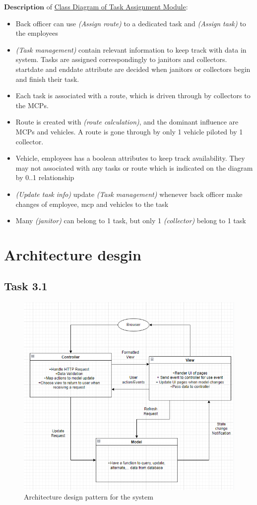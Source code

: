 \documentclass[a4paper]{article}
\begin{document}
$\textbf{Description}$ of \hyperlink{class}{Class Diagram of Task Assignment Module}:
\begin{itemize}
    \item Back officer can use \textit{(Assign route)} to a dedicated task and \textit{(Assign task)} to the employees
    \item \textit{(Task management)} contain relevant information to keep track with data in system. Tasks are assigned correspondingly to janitors and collectors. startdate and enddate attribute are decided when janitors or collectors begin and finish their task.
    \item Each task is associated with a route, which is driven through by collectors to the MCPs.
    \item Route is created with \textit{(route calculation)}, and the dominant influence are MCPs and vehicles. A route is gone through by only 1 vehicle piloted by 1 collector.
    \item Vehicle, employees has a boolean attributes to keep track availability. They may not associated with any tasks or route which is indicated on the diagram by 0..1 relationship
    \item \textit{(Update task info)} update \textit{(Task management)} whenever back officer make changes of employee, mcp and vehicles to the task
    \item Many \textit{(janitor)} can belong to 1 task, but only 1 \textit{(collector)} belong to 1 task
\end{itemize}

\section{Architecture desgin}
\subsection{Task 3.1}

\begin{figure}
\centering
  \includegraphics[width=0.6\linewidth]{architecture approach.png}
  \hypertarget{MVC}{\caption{Architecture design pattern for the system}}
\end{figure}
\end{document}
